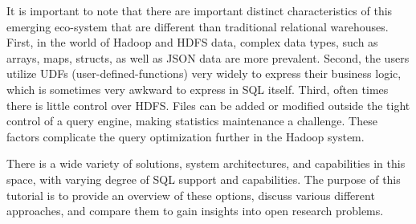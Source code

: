 \documentclass{vldb}
\newcounter{mycounter}
\begin{document}
It is important to note that there are important distinct characteristics of this emerging eco-system that are different than traditional relational warehouses.
First, in the world of Hadoop and HDFS data, complex data types, such as arrays, maps, structs, as well as JSON data are more prevalent.
Second, the users utilize UDFs (user-defined-functions) very widely to express their business logic, which is sometimes very awkward to express in SQL itself. 
Third, often times there is little control over HDFS. Files can be added or modified outside the tight control of a query engine, making statistics maintenance a challenge.
These factors complicate the query optimization further in the Hadoop system. 

There is a wide variety of solutions, system architectures, and capabilities in this space, with varying degree of SQL support and capabilities. The purpose of this tutorial is to provide an overview of these options, discuss various different approaches, and compare them to gain insights into open research problems. 


\end{document}
